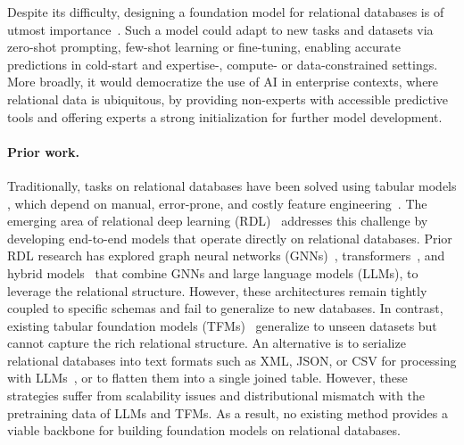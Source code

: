 Despite its difficulty, designing a foundation model for relational databases is of utmost importance~\citep{vogel2022towards}. Such a model could adapt to new tasks and datasets via zero-shot prompting, few-shot learning or fine-tuning, enabling accurate predictions in cold-start and expertise-, compute- or data-constrained settings. More broadly, it would democratize the use of AI in enterprise contexts, where relational data is ubiquitous, by providing non-experts with accessible predictive tools and offering experts a strong initialization for further model development.




\paragraph{Prior work.} Traditionally, tasks on relational databases have been solved using tabular models \citep{chen2016xgboost,shwartz2022tabular}, which depend on manual, error-prone, and costly feature engineering~\citep{lam2021automated}. The emerging area of relational deep learning (RDL)~\citep{rdl} addresses this challenge by developing end-to-end models that operate directly on relational databases. Prior RDL research has explored graph neural networks (GNNs)~\citep{relbench,relgnn}, transformers~\citep{relgt, dbformer}, and hybrid models~\citep{relllm} that combine GNNs and large language models (LLMs), to leverage the relational structure. However, these architectures remain tightly coupled to specific schemas and fail to generalize to new databases. In contrast, existing tabular foundation models (TFMs)~\citep{tabpfn, tabpfnv2, carte, tabicl, portal, G2T-FM} generalize to unseen datasets but cannot capture the rich relational structure. 
An alternative is to serialize relational databases into text formats such as XML, JSON, or CSV for processing with LLMs~\citep{snowflake2024relational}, or to flatten them into a single joined table. However, these strategies suffer from scalability issues and distributional mismatch with the pretraining data of LLMs and TFMs. As a result, no existing method provides a viable backbone for building foundation models on relational databases.



